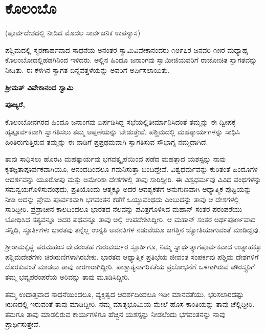 
\chapter{ಕೊಲಂಬೊ}

\begin{center}
(ಪೂರ್ವದೇಶದಲ್ಲಿ ನೀಡಿದ ಮೊದಲ ಸಾರ್ವಜನಿಕ ಉಪನ್ಯಾಸ)
\end{center}

ಪಶ್ಚಿಮದಲ್ಲಿ ಸ್ಮರಣಾರ್ಹವಾದ ಸಾಧನೆಯ ಅನಂತರ ಸ್ವಾಮಿ\break ವಿವೇಕಾನಂದರು ೧೮೯೭ರ ಜನವರಿ ೧೫ರ ಮಧ್ಯಾಹ್ನ ಕೊಲಂಬೋದಲ್ಲಿ\break ಹಡಗಿನಿಂದ ಇಳಿದರು. ಅಲ್ಲಿನ ಹಿಂದೂ ಜನಾಂಗವು ಸ್ವಾಮೀಜಿಯವರಿಗೆ ರಾಜೋಚಿತ ಸ್ವಾಗತವನ್ನು ನೀಡಿತು. ಈ ಕೆಳಗಿನ ಸ್ವಾಗತ ಬಿನ್ನವತ್ತಳೆಯನ್ನು ಅವರಿಗೆ ಅರ್ಪಿಸಲಾಯಿತು.

\begin{center}
\textbf{ಶ‍್ರೀಮತ್​ ವಿವೇಕಾನಂದ ಸ್ವಾಮಿ}
\end{center}

\textbf{ಪೂಜ್ಯರೆ,}

\vskip 2pt

ಕೊಲಂಬೋನಗರದ ಹಿಂದೂ ಜನಾಂಗವು ಏರ್ಪಡಿಸಿದ್ದ ಸಭೆಯಲ್ಲಿ\break ತೀರ್ಮಾನಿಸಿದಂತೆ ತಮ್ಮನ್ನು ಈ ದ್ವೀಪಕ್ಕೆ ಹೃತ್ಪೂರ್ವಕವಾಗಿ ಸ್ವಾಗತಿಸಲು ತಮ್ಮ ಅಪ್ಪಣೆಯನ್ನು ಬೇಡುತ್ತೇವೆ. ಪಶ್ಚಿಮದಲ್ಲಿ ಮಹತ್ಕಾರ್ಯಗಳನ್ನು ಸಾಧಿಸಿ ಹಿಂತಿರುಗುತ್ತಿರುವ ತಮ್ಮನ್ನು ಈ ನಾಡಿಗೆ ಪ್ರಪ್ರಥಮವಾಗಿ ಸ್ವಾಗತಿಸುವ ಸೌಭಾಗ್ಯ ನಮ್ಮದಾಗಿದೆ.

ತಾವು ಸಾಧಿಸಲು ಹೊರಟ ಮಹತ್ಕಾರ್ಯವು ಭಗವತ್ಕೃಪೆಯಿಂದ ಪಡೆದ ಮಹತ್ತಾದ ಯಶಸ್ಸನ್ನು ನಾವು ಕೃತಜ್ಞತಾಪೂರ್ವಕವಾಗಿಯೂ, ಆನಂದ\-ದಿಂದಲೂ ಗಮನಿಸುತ್ತಾ ಬಂದಿದ್ದೇವೆ. ವಿಶ್ವಧರ್ಮವನ್ನು ಕುರಿತಂತೆ ಹಿಂದೂಗಳ ಆದರ್ಶವನ್ನು ಯೂರೋಪು ಮತ್ತು ಅಮೇರಿಕಾ ದೇಶಗಳಲ್ಲಿ ತಾವು ಸಾರಿದ್ದೀರಿ. ಈ ವಿಶ್ವಧರ್ಮವು ವಿವಿಧ ಪಂಥಗಳನ್ನು ಸಮನ್ವಯಗೊಳಿಸುವಂಥದು, ಪ್ರತಿಯೊಂದು ಆತ್ಮಕ್ಕೂ ಅದರ ಆವಶ್ಯಕತೆಗೆ ಅನುಗುಣವಾಗಿ ಆಧ್ಯಾತ್ಮಿಕ ಪುಷ್ಟಿಯನ್ನು ನೀಡಿ ಅದನ್ನು ಪ್ರೇಮ ಪೂರ್ವಕವಾಗಿ ಭಗವಂತನ ಕಡೆಗೆ ಒಯ್ಯುವಂಥದು ಎಂಬುದನ್ನು ತಾವು ಆ ದೇಶಗಳಲ್ಲಿ ಸಾರಿದ್ದೀರಿ. ಪ್ರಪ್ರಾಚೀನ ಕಾಲದಿಂದಲೂ ಭಾರತದ ನೆಲವನ್ನು ಪವಿತ್ರಗೊಳಿಸಿದ ಮಹಾನ್​ ಸಂತರ ಪರಂಪರೆಯು ಬೋಧಿಸಿದ ಸತ್ಯವನ್ನೂ ಅದರ ಪಥವನ್ನೂ ತಾವು ಅಲ್ಲಿ ಉಪದೇಶಿಸಿದ್ದೀರಿ. ಆ ಮಹಾನ್​ ಸಂತರ ಅರ್ಥಪೂರ್ಣವಾದ ಸನ್ನಿಧಿ, ಸ್ಫೂರ್ತಿಗಳು ಭಾರತವು ತನ್ನೆಲ್ಲ ಉನ್ನತಿ ಅವನತಿಗಳ ನಡುವೆಯೂ ಜಗತ್ತಿನ ಜ್ಯೋತಿಯಾಗುವಂತೆ ಮಾಡಿದ್ದವು.

ಶ‍್ರೀರಾಮಕೃಷ್ಣ ಪರಮಹಂಸ ದೇವರಂತಹ ಗುರುವರ್ಯರ ಸ್ಫೂರ್ತಿಗೂ, ನಿಮ್ಮ ಸ್ವಾರ್ಥತ್ಯಾಗಪೂರ್ವಕವಾದ ಉತ್ಸಾಹಕ್ಕೂ ಪಶ್ಚಿಮದೇಶಗಳು ಚಿರಋಣಿಗಳಾಗಿರಬೇಕು. ಭಾರತದ ಆಧ್ಯಾತ್ಮಿಕ ಪ್ರತಿಭೆಯ ಜೀವಂತ ಸಂಪರ್ಕವು ಪಶ್ಚಿಮ ದೇಶಗಳಿಗೆ ದೊರಕುವಂತೆ ಮಾಡಲು ತಾವು ಕಾರಣರಾಗಿದ್ದೀರಿ. ಪಾಶ್ಚಾತ್ಯ\break ನಾಗರಿಕತೆಯ ಪ್ರಲೋಭನೆಗೆ ಒಳಗಾಗಿರುವ ಪೌರಸ್ತ್ಯರಿಗೆ ತಮ್ಮ ಭವ್ಯ\break ಪರಂಪರೆಯ ಅರಿವನ್ನು ತಾವು ಮೂಡಿಸಿದ್ದೀರಿ.

ತಮ್ಮ ಉದಾತ್ತವಾದ ಸಾಧನೆಯಿಂದಲೂ, ವ್ಯಕ್ತಿತ್ವದ ಆದರ್ಶದಿಂದಲೂ ಇಡೀ ಮಾನವತೆಯು, ಭರಿಸಲಾರದಷ್ಟು ಋಣದಲ್ಲಿ ಇರುವಂತೆ ತಾವು ಮಾಡಿದ್ದೀರಿ. ನಮ್ಮ ಮಾತೃಭೂಮಿಯ ಮೇಲೆ ಹೊಸ ಕಾಂತಿಯನ್ನು ತಾವು ಚೆಲ್ಲಿದ್ದೀರಿ. ತಮಗೂ ತಾವು ಮಾಡಲಿರುವ ಕಾರ್ಯಗಳಿಗೂ ಹೆಚ್ಚಿನ ಯಶಸ್ಸನ್ನು ನೀಡಲೆಂದು ಭಗವಂತನನ್ನು ನಾವು ಪ್ರಾರ್ಥಿಸುತ್ತೇವೆ.

